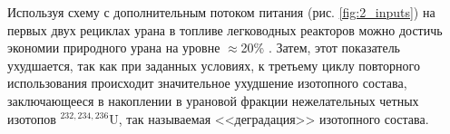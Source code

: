 

Используя схему с дополнительным потоком питания (рис. \ref{fig:2_inputs}) на первых двух рециклах урана в топливе легководных реакторов можно достичь экономии природного урана на уровне $\approx$20\% \cite{smirnovApplyingEnrichmentCapacities2018}. Затем, этот показатель ухудшается, так как при заданных условиях, к третьему циклу повторного использования происходит значительное ухудшение изотопного состава, заключающееся в накоплении в урановой фракции нежелательных четных изотопов $^{232,234,236}$U, так называемая <<деградация>> изотопного состава.


